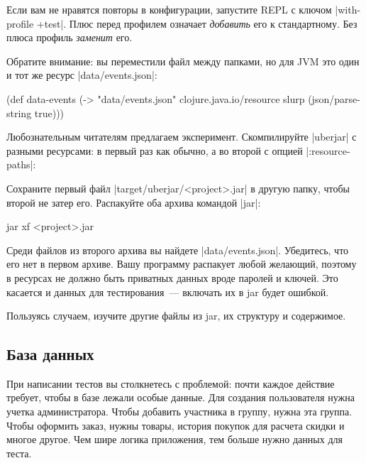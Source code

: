 Если вам не нравятся повторы в конфигурации, запустите REPL с ключом
\spverb|with-profile +test|. Плюс перед профилем означает \emph{добавить} его к
стандартному. Без плюса профиль \emph{заменит} его.

Обратите внимание: вы переместили файл между папками, но для JVM это один и тот
же ресурс \spverb|data/events.json|:

\begin{english}
  \begin{clojure}
(def data-events
  (-> "data/events.json"
      clojure.java.io/resource
      slurp
      (json/parse-string true)))
  \end{clojure}
\end{english}

Любознательным читателям предлагаем эксперимент. Скомпилируйте \spverb|uberjar|
с разными ресурсами: в первый раз как обычно, а во второй с опцией
\spverb|:resource-paths|:

\begin{english}
  \begin{clojure}
:profiles {:uberjar {:resource-paths ["env/test/resources"]}
  \end{clojure}
\end{english}

Сохраните первый файл \spverb|target/uberjar/<project>.jar| в другую папку,
чтобы второй не затер его. Распакуйте оба архива командой \spverb|jar|:

\begin{english}
  \begin{bash}
jar xf <project>.jar
  \end{bash}
\end{english}

Среди файлов из второго архива вы найдете \spverb|data/events.json|. Убедитесь,
что его нет в первом архиве. Вашу программу распакует любой желающий, поэтому в
ресурсах не должно быть приватных данных вроде паролей и ключей. Это касается и
данных для тестирования~--- включать их в jar будет ошибкой.

Пользуясь случаем, изучите другие файлы из jar, их структуру и содержимое.

\subsection{База данных}

При написании тестов вы столкнетесь с проблемой: почти каждое действие требует,
чтобы в базе лежали особые данные. Для создания пользователя нужна учетка
администратора. Чтобы добавить участника в группу, нужна эта группа. Чтобы
оформить заказ, нужны товары, история покупок для расчета скидки и многое
другое. Чем шире логика приложения, тем больше нужно данных для теста.


